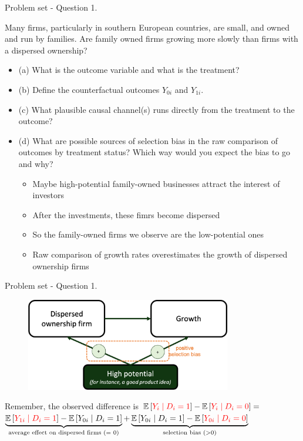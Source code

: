 \documentclass[aspectratio=169, 11pt]{beamer}
\begin{document}
\begin{frame}{Problem set - Question 1.}

Many firms, particularly in southern European countries, are small, and owned and run by families. 
Are family owned firms growing more slowly than firms with a dispersed ownership?

\begin{itemize}
    \item (a) What is the outcome variable and what is the treatment?
    \item (b) Define the counterfactual outcomes $Y_{0i}$ and $Y_{1i}$.
    \item (c) What plausible causal channel(s) runs directly from the treatment to the outcome?
    \item \alert{(d) What are possible sources of selection bias in the raw comparison of outcomes by treatment status? Which way would you expect the bias to go and why?}
    \begin{itemize}
        \item \alert{Maybe high-potential family-owned businesses attract the interest of investors}
        \item \alert{After the investments, these fimrs become dispersed}
        \item \alert{So the family-owned firms we observe are the low-potential ones}
        \item \alert{Raw comparison of growth rates overestimates the growth of dispersed ownership firms}
    \end{itemize}
\end{itemize}
\end{frame}


\begin{frame}{Problem set - Question 1.}

\begin{figure}
    \centering
    \includegraphics[width=0.8\textwidth]{selectionQ1.png}
\end{figure}

Remember, the observed difference is $\mathbb{E}\left[\textcolor{red}{Y_{i} \mid D_{i}=1}\right]-\mathbb{E}\left[\textcolor{red}{Y_{i} \mid D_{i}=0}\right] = $ \\ 
    $ \underbrace{\mathbb{E}\left[\textcolor{red}{Y_{1 i} \mid D_{i}=1}\right]-\mathbb{E}\left[Y_{0 i} \mid D_{i}=1\right]}_{\text {average effect on dispersed firms (= 0)}} + \underbrace{\mathbb{E}\left[Y_{0 i} \mid D_{i}=1\right]-\mathbb{E}\left[\textcolor{red}{Y_{0 i} \mid D_{i}=0}\right]}_{\text {selection bias } (> 0)} $

\end{frame}
\end{document}
